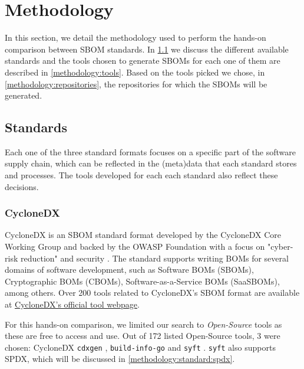 \section{Methodology}

In this section, we detail the methodology used to perform the hands-on comparison between SBOM standards. In \ref{methodology:standards} we discuss the different available standards and the tools chosen to generate SBOMs for each one of them are described in \ref{methodology:tools}. Based on the tools picked we chose, in \ref{methodology:repositories}, the repositories for which the SBOMs will be generated.

\subsection{Standards} \label{methodology:standards}

Each one of the three standard formats focuses on a specific part of the software supply chain, which can be reflected in the (meta)data that each standard stores and processes. The tools developed for each each standard also reflect these decisions.

\subsubsection{CycloneDX} \label{methodology:standard:cdx}

CycloneDX \cite{standards:sbom:cyclonedx} is an SBOM standard format developed by the CycloneDX Core Working Group and backed by the OWASP Foundation with a focus on "cyber-risk reduction" \cite{standards:sbom:cyclonedx} and security \cite{article:sbom-study}. The standard supports writing BOMs for several domains of software development, such as Software BOMs (SBOMs), Cryptographic BOMs (CBOMs), Software-as-a-Service BOMs (SaaSBOMs), among others. Over 200 tools related to CycloneDX's SBOM format are available at \href{https://cyclonedx.org/tool-center/}{\underline{CycloneDX's official tool webpage}}.

For this hands-on comparison, we limited our search to \emph{Open-Source} tools as these are free to access and use. Out of 172 listed Open-Source tools, 3 were chosen: CycloneDX \verb|cdxgen| \cite{repository:cyclonedx:cdxgen}, \verb|build-info-go| \cite{repository:cyclonedx:build-info-go} and \verb|syft| \cite{repository:cyclonedx:syft}. \verb|syft| also supports SPDX, which will be discussed in \ref{methodology:standard:spdx}.

